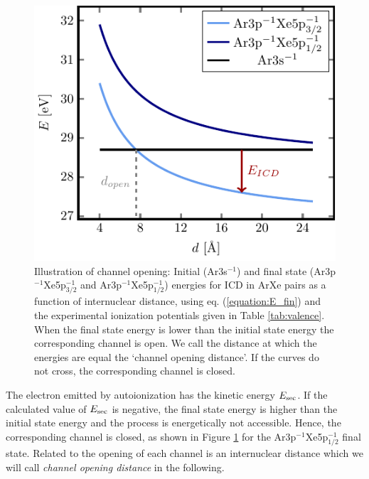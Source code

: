\documentclass[journal=jpccck,manuscript=article]{achemso}
\begin{document}
\begin{figure}[h]
 \centering
 \includegraphics[width=\columnwidth]{channel_open_ICD.pdf}
 \caption{Illustration of channel opening: Initial (Ar3s$^{-1}$)
          and final state (Ar3p$^{-1}$Xe5p$_{3/2}^{-1}$ and
          Ar3p$^{-1}$Xe5p$_{1/2}^{-1}$) energies
          for ICD in ArXe pairs as a function of 
          internuclear distance, using eq. (\ref{equation:E_fin})
          and the experimental ionization
          potentials given
          in Table \ref{tab:valence}. When the final state energy is lower
          than the initial state energy the corresponding channel
          is open. We call the distance at which the energies are equal
          the `channel opening distance'. If the curves do not cross, the
          corresponding channel is closed.}
 \label{figure:channel_open_ICD}
\end{figure}

The electron emitted by autoionization has the kinetic energy $E_{\rm sec}$. 
If the calculated value of $E_{\rm sec}$ is negative,
the final state energy is higher than the initial state energy and the        
process is energetically not accessible. Hence, the corresponding channel     
is closed, as shown in Figure \ref{figure:channel_open_ICD} for the
Ar3p$^{-1}$Xe5p$_{1/2}^{-1}$ final state. Related to
the opening of each channel is an internuclear distance which we will call 
\emph{channel opening distance} in the following.
                                                               
\end{document}
